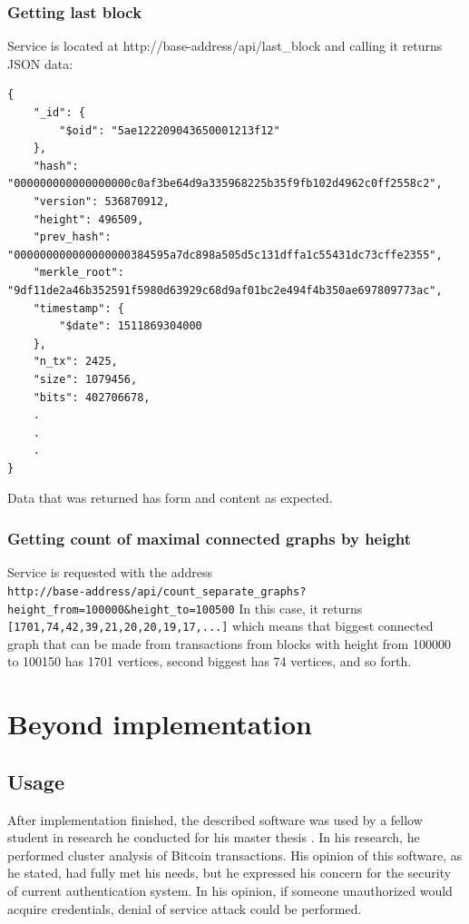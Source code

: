 \documentclass[12pt, en, eng, oneside, final]{mgr}
\begin{document}
\subsection{Getting last block}
Service is located at http://base-address/api/last\_block and calling it returns JSON data:
\begin{lstlisting}[caption=Response on last block API call]
{
    "_id": {
        "$oid": "5ae122209043650001213f12"
    },
    "hash": "000000000000000000c0af3be64d9a335968225b35f9fb102d4962c0ff2558c2",
    "version": 536870912,
    "height": 496509,
    "prev_hash": "000000000000000000384595a7dc898a505d5c131dffa1c55431dc73cffe2355",
    "merkle_root": "9df11de2a46b352591f5980d63929c68d9af01bc2e494f4b350ae697809773ac",
    "timestamp": {
        "$date": 1511869304000
    },
    "n_tx": 2425,
    "size": 1079456,
    "bits": 402706678,
    .
    .
    .
}
\end{lstlisting}

Data that was returned has form and content as expected. 

\subsection{Getting count of maximal connected graphs by height}
Service is requested with the address
\\ \verb|http://base-address/api/count_separate_graphs?height_from=100000&height_to=100500|
In this case, it returns \texttt{[1701,74,42,39,21,20,20,19,17,...]} which means that biggest connected graph that can be made from transactions from blocks with height from 100000 to 100150 has 1701 vertices, second biggest has 74 vertices, and so forth.


\chapter{Beyond implementation}

\section{Usage}
After implementation finished, the described software was used by a fellow student in research he conducted for his master thesis \cite{twardak}. In his research, he performed cluster analysis of Bitcoin transactions. His opinion of this software, as he stated, had fully met his needs, but he expressed his concern for the security of current authentication system. In his opinion, if someone unauthorized would acquire credentials, denial of service attack could be performed.
\end{document}
